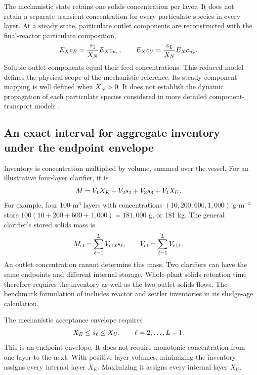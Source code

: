 The mechanistic state retains one solids concentration per layer. It does not retain a separate transient concentration for every particulate species in every layer. At a steady state, particulate outlet components are reconstructed with the final-reactor particulate composition,
\begin{equation}
\equationname{Particulate outlet reconstruction from endpoint solids concentrations}
E_Xc_E=\frac{s_1}{X_N}E_Xc_{n_r},\qquad
E_Xc_U=\frac{s_L}{X_N}E_Xc_{n_r}.
\label{eq:plant_outlet_reconstruction}
\end{equation}
Soluble outlet components equal their feed concentrations. This reduced model defines the physical scope of the mechanistic reference. Its steady component mapping is well defined when $X_N>0$. It does not establish the dynamic propagation of each particulate species considered in more detailed component-transport models \citep{JeppssonDiehl1996}.

\subsection{An exact interval for aggregate inventory under the endpoint envelope}

Inventory is concentration multiplied by volume, summed over the vessel. For an illustrative four-layer clarifier, it is
\begin{equation}
\equationname{Illustrative four-layer clarifier solids inventory}
M=V_1X_E+V_2s_2+V_3s_3+V_4X_U.
\end{equation}
For example, four 100-m$^3$ layers with concentrations $(10,200,600,1{,}000)$ g m$^{-3}$ store $100(10+200+600+1{,}000)=181{,}000$ g, or 181 kg. The general clarifier's stored solids mass is
\begin{equation}
\equationname{General clarifier solids inventory and total volume}
M_{\rm cl}=\sum_{\ell=1}^{L}V_{{\rm cl},\ell}s_\ell,\qquad
V_{\rm cl}=\sum_{\ell=1}^{L}V_{{\rm cl},\ell}.
\label{eq:plant_inventory_definition}
\end{equation}
An outlet concentration cannot determine this mass. Two clarifiers can have the same endpoints and different internal storage. Whole-plant solids retention time therefore requires the inventory as well as the two outlet solids flows. The benchmark formulation of \citet{Alex2008} includes reactor and settler inventories in its sludge-age calculation.

The mechanistic acceptance envelope requires
\begin{equation}
\equationname{Interior-layer solids envelope between the outlet concentrations}
X_E\le s_\ell\le X_U,\qquad \ell=2,\ldots,L-1.
\label{eq:plant_layer_envelope}
\end{equation}
This is an endpoint envelope. It does not require monotonic concentration from one layer to the next. With positive layer volumes, minimizing the inventory assigns every internal layer $X_E$. Maximizing it assigns every internal layer $X_U$.

